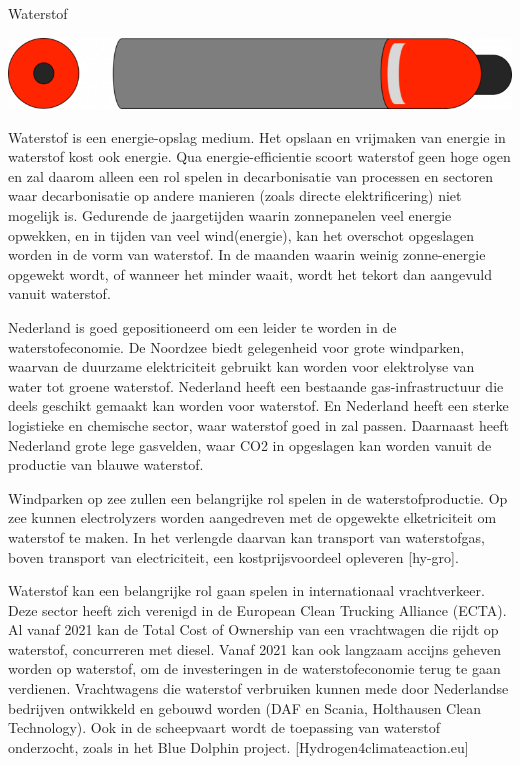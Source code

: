 \begin{voorstel}{Waterstof}
\begin{overwegingen}
\includegraphics[width=.5\textwidth]{img/energie/waterstof-tank}

Waterstof is een energie-opslag medium. Het opslaan en vrijmaken van energie in waterstof kost ook energie. Qua energie-efficientie scoort waterstof geen hoge ogen en zal daarom alleen een rol spelen in decarbonisatie van processen en sectoren waar decarbonisatie op andere manieren (zoals directe elektrificering) niet mogelijk is. Gedurende de jaargetijden waarin zonnepanelen veel energie opwekken, en in tijden van veel wind(energie), kan het overschot opgeslagen worden in de vorm van waterstof. In de maanden waarin weinig zonne-energie opgewekt wordt, of wanneer het minder waait, wordt het tekort dan aangevuld vanuit waterstof.

Nederland is goed gepositioneerd om een leider te worden in de waterstofeconomie. De Noordzee biedt gelegenheid voor grote windparken, waarvan de duurzame elektriciteit gebruikt kan worden voor elektrolyse van water tot groene waterstof. Nederland heeft een bestaande gas-infrastructuur die deels geschikt gemaakt kan worden voor waterstof. En Nederland heeft een sterke logistieke en chemische sector, waar waterstof goed in zal passen. Daarnaast heeft Nederland grote lege gasvelden, waar CO2 in opgeslagen kan worden vanuit de productie van blauwe waterstof.

Windparken op zee zullen een belangrijke rol spelen in de waterstofproductie. Op zee kunnen electrolyzers worden aangedreven met de opgewekte elketriciteit om waterstof te maken. In het verlengde daarvan kan transport van waterstofgas, boven transport van electriciteit, een kostprijsvoordeel opleveren [hy-gro].

Waterstof kan een belangrijke rol gaan spelen in internationaal vrachtverkeer. Deze sector heeft zich verenigd in de European Clean Trucking Alliance (ECTA). Al vanaf 2021 kan de Total Cost of Ownership van een vrachtwagen die rijdt op waterstof, concurreren met diesel. Vanaf 2021 kan ook langzaam accijns geheven worden op waterstof, om de investeringen in de waterstofeconomie terug te gaan verdienen. Vrachtwagens die waterstof verbruiken kunnen mede door Nederlandse bedrijven ontwikkeld en gebouwd worden (DAF en Scania, Holthausen Clean Technology). Ook in de scheepvaart wordt de toepassing van waterstof onderzocht, zoals in het Blue Dolphin project. [Hydrogen4climateaction.eu]


\end{overwegingen}
\end{voorstel}
